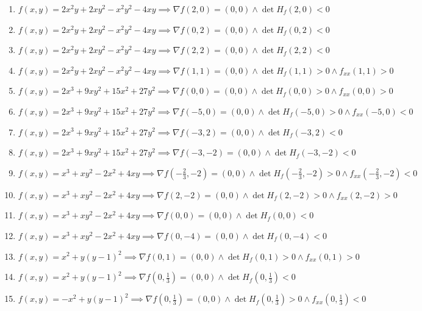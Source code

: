 \documentclass[11pt,a4paper]{article}
\begin{document}
\begin{enumerate}
\item $\displaystyle f(x, y) = 2x^{2} y + 2x y^{2} - x^{2} y^{2} - 4xy \implies \nabla f(2, 0) = (0, 0) \land \det H_{f}(2, 0) < 0$
\item $\displaystyle f(x, y) = 2x^{2} y + 2x y^{2} - x^{2} y^{2} - 4xy \implies \nabla f(0, 2) = (0, 0) \land \det H_{f}(0, 2) < 0$
\item $\displaystyle f(x, y) = 2x^{2} y + 2x y^{2} - x^{2} y^{2} - 4xy \implies \nabla f(2, 2) = (0, 0) \land \det H_{f}(2, 2) < 0$
\item $\displaystyle f(x, y) = 2x^{2} y + 2x y^{2} - x^{2} y^{2} - 4xy \implies \nabla f(1, 1) = (0, 0) \land \det H_{f}(1, 1) > 0 \land f_{xx}(1, 1) > 0$
\item $\displaystyle f(x, y) = 2x^{3} + 9x y^{2} + 15x^{2} + 27y^{2} \implies \nabla f(0, 0) = (0, 0) \land \det H_{f}(0, 0) > 0 \land f_{xx}(0, 0) > 0$
\item $\displaystyle f(x, y) = 2x^{3} + 9x y^{2} + 15x^{2} + 27y^{2} \implies \nabla f(-5, 0) = (0, 0) \land \det H_{f}(-5, 0) > 0 \land f_{xx}(-5, 0) < 0$
\item $\displaystyle f(x, y) = 2x^{3} + 9x y^{2} + 15x^{2} + 27y^{2} \implies \nabla f(-3, 2) = (0, 0) \land \det H_{f}(-3, 2) < 0$
\item $\displaystyle f(x, y) = 2x^{3} + 9x y^{2} + 15x^{2} + 27y^{2} \implies \nabla f(-3, -2) = (0, 0) \land \det H_{f}(-3, -2) < 0$
\item $\displaystyle f(x, y) = x^{3} + x y^{2} - 2x^{2} + 4xy \implies \nabla f\left( -\frac{2}{3}, -2 \right) = (0, 0) \land \det H_{f}\left( -\frac{2}{3}, -2 \right) > 0 \land f_{xx}\left( -\frac{2}{3}, -2 \right) < 0$
\item $\displaystyle f(x, y) = x^{3} + x y^{2} - 2x^{2} + 4xy \implies \nabla f(2, -2) = (0, 0) \land \det H_{f}(2, -2) > 0 \land f_{xx}(2, -2) > 0$
\item $\displaystyle f(x, y) = x^{3} + x y^{2} - 2x^{2} + 4xy \implies \nabla f(0, 0) = (0, 0) \land \det H_{f}(0, 0) < 0$
\item $\displaystyle f(x, y) = x^{3} + x y^{2} - 2x^{2} + 4xy \implies \nabla f(0, -4) = (0, 0) \land \det H_{f}(0, -4) < 0$
\item $\displaystyle f(x, y) = x^{2} + y(y - 1)^{2} \implies \nabla f(0, 1) = (0, 0) \land \det H_{f}(0, 1) > 0 \land f_{xx}(0, 1) > 0$
\item $\displaystyle f(x, y) = x^{2} + y(y - 1)^{2} \implies \nabla f\left( 0, \frac{1}{3} \right) = (0, 0) \land \det H_{f}\left( 0, \frac{1}{3} \right) < 0$
\item $\displaystyle f(x, y) = -x^{2} + y(y - 1)^{2} \implies \nabla f\left( 0, \frac{1}{3} \right) = (0, 0) \land \det H_{f}\left( 0, \frac{1}{3} \right) > 0 \land f_{xx}\left( 0, \frac{1}{3} \right) < 0$

\end{enumerate}
\end{document}
